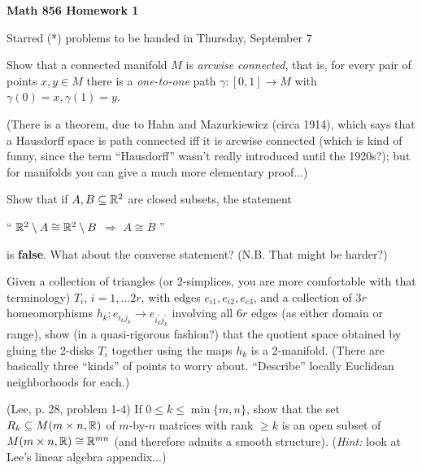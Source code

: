 
\nopagenumbers


\loadmsbm

\def\ctln{\centerline}
\def\ssk{\smallskip}
\def\msk{\medskip}
\def\bsk{\bigskip}
\def\nidt{\noindent}
\def\del{\partial}
\def\bbr{{\Bbb R}}


\ctln{\bf Math 856 Homework 1}

\ssk

\ctln{Starred (*) problems to be handed in Thursday, September 7}

\bsk

\nidt {\bf (*) 1:} Show that a connected manifold $M$ is {\it arcwise connected},
that is, for every pair of points $x,y\in M$ there is a
{\it one-to-one} path $\gamma:[0,1]\rightarrow M$ with $\gamma(0)=x,\gamma(1)=y$.

\ssk

(There is a theorem, due to Hahn and Mazurkiewicz (circa 1914), which says 
that a Hausdorff space is path connected iff it is
arcwise connected (which is kind of funny, since the term ``Hausdorff''
wasn't really introduced until the 1920s?); but for manifolds you can 
give a much more elementary proof...)

\msk

\nidt{\bf 2:} Show that if $A,B\subseteq {\Bbb R}^2$ are closed subsets, the statement

\ctln{`` ${\Bbb R}^2\setminus A \cong {\Bbb R}^2\setminus B$ $\Rightarrow$
$A \cong B$ ''}

\hfill is {\bf false}. What about the converse statement?
(N.B. That might be harder?)

\msk

\nidt {\bf (*) 3:} Given a collection of triangles (or 2-simplices, you are more
comfortable with that terminology) $T_i$, $i=1,\ldots 2r$, with edges
$e_{i1},e_{i2},e_{e3}$, and a collection of $3r$ homeomorphisms 
$h_k:e_{i_kj_k}\rightarrow e_{i_k^\prime j_k^\prime}$ involving all $6r$ edges
(as either domain or range),
show (in a quasi-rigorous fashion?) that the quotient space obtained
by gluing the 2-disks $T_i$ together using the maps $h_k$ is a 2-manifold.
(There are basically three ``kinds'' of points to worry about. ``Describe'' 
locally Euclidean neighborhoods for each.)

\msk

\nidt {\bf (*) 4:} (Lee, p. 28, problem 1-4) If $0\leq k\leq \min\{m,n\}$, show that the set 
$R_k\subseteq M(m\times n,{\Bbb R})$ of $m$-by-$n$ matrices 
with rank $\geq k$ is an open subset of $M(m\times n,{\Bbb R})
\cong {\Bbb R}^{mn}$ (and therefore admits a smooth structure).
({\it Hint:} look at Lee's linear algebra appendix...)

